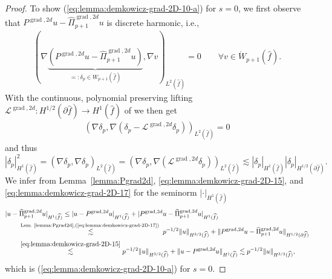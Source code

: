\documentclass{article}
\newcommand{\hatPigradcomtwod}{\widehat\Pi^{\operatorname*{grad},2d}_{p+1}}
\begin{document}
\begin{proof}
To show (\ref{eq:lemma:demkowicz-grad-2D-10-a}) for $s=0$, we first observe that 
$P^{\operatorname*{grad},2d} u - \hatPigradcomtwod u$ is discrete harmonic, i.e., 
\begin{align*} 
(\nabla \underbrace{(P^{\operatorname{grad},2d} u - \hatPigradcomtwod u)
                   }_{=:\delta_p \in W_{p+1}(\widehat f)} ,\nabla v)_{L^2(\widehat f)} = 0 
\qquad \forall v \in \mathring{W}_{p+1}(\widehat f).
\end{align*}
With the continuous, polynomial preserving lifting 
${\mathcal{L}}^{\operatorname{grad},2d}:H^{1/2}(\partial\widehat{f}) \rightarrow H^1(\widehat{f})$ 
of \cite{babuska-craig-mandel-pitkaranta91} 
we then get
\begin{align*}
\left(\nabla \delta_p ,\nabla (\delta_p-{\mathcal{L}}^{\operatorname{grad},2d} \delta_p)\right)_{L^2(\widehat f)} = 0
\end{align*}
and thus
\begin{equation}
\label{eq:lemma:demkowicz-grad-2D-17}
|\delta_p|_{H^1(\widehat{f})}^2 \!=\! (\nabla \delta_p,\nabla \delta_p)_{L^2(\widehat{f})} 
\!=\! (\nabla \delta_p ,\nabla({\mathcal{L}}^{\operatorname{grad},2d}\delta_p))_{L^2(\widehat{f})} 
\!\lesssim\! |\delta_p|_{H^1(\widehat{f})} |\delta_p|_{H^{1/2}(\partial\widehat{f})}.
\!\!
\!\!
\!\!
\end{equation}
We infer from Lemma~\ref{lemma:Pgrad2d}, 
\eqref{eq:lemma:demkowicz-grad-2D-15}, and \eqref{eq:lemma:demkowicz-grad-2D-17} for the seminorm 
$|\cdot|_{H^1(\widehat{f})}$
\begin{align}
\label{eq:lemma:demkowicz-2d-105}
& |u-\hatPigradcomtwod u|_{H^1(\widehat{f})} \leq |u-P^{\operatorname*{grad},2d}u|_{H^1(\widehat{f})} + |P^{\operatorname*{grad},2d}u-\hatPigradcomtwod u|_{H^1(\widehat{f})} \\
\nonumber 
&\qquad \stackrel{\text{Lem.~\ref{lemma:Pgrad2d},(\ref{eq:lemma:demkowicz-grad-2D-17}) }}{\lesssim} p^{-1/2} \Vert u\Vert_{H^{3/2}(\widehat{f})} + \Vert P^{\operatorname*{grad},2d}u-\hatPigradcomtwod u\Vert_{H^{1/2}(\partial\widehat{f})} \\
\nonumber 
&\qquad 
\stackrel{\eqref{eq:lemma:demkowicz-grad-2D-15}}{ \lesssim}
 p^{-1/2} \Vert u\Vert_{H^{3/2}(\widehat{f})} + \Vert u-P^{\operatorname*{grad},2d}u\Vert_{H^1(\widehat{f})} 
\lesssim p^{-1/2} \Vert u\Vert_{H^{3/2}(\widehat{f})},
\end{align}
which is (\ref{eq:lemma:demkowicz-grad-2D-10-a}) for $s=0$. 


\end{proof}
\end{document}
